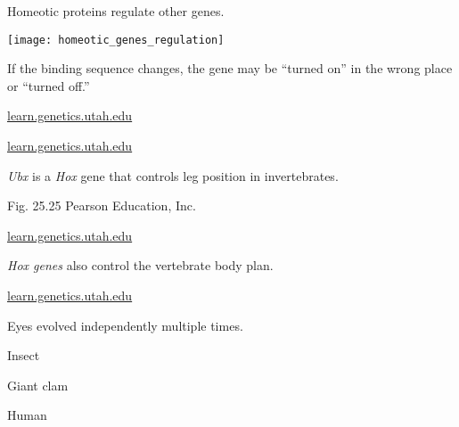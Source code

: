 \documentclass[t,handout]{beamer}  %
\begin{document}
%
\begin{frame}[t]{Homeotic proteins regulate other genes.}
	\vspace*{-0.5\baselineskip}
	\begin{center}
		\texttt{[image: homeotic\_genes\_regulation]}
	\end{center}
	
	If the binding sequence changes, the gene may be ``turned on'' in the wrong place or ``turned off.''
	\vfilll

	\hfill \tiny \href{http://learn.genetics.utah.edu/basics/hoxgenes}{learn.genetics.utah.edu}
\end{frame}
%
{
\begin{frame}[b]{}

	\tiny \href{http://learn.genetics.utah.edu/basics/hoxgenes}{learn.genetics.utah.edu}
\end{frame}
}
%
{
\begin{frame}[b]{\textit{Ubx} is a \textit{Hox} gene that controls leg position in invertebrates.}

	\hfill \tiny Fig. 25.25 \textcopyright Pearson Education, Inc.
\end{frame}
}
%
{
\begin{frame}[b]{}

	\tiny \href{http://learn.genetics.utah.edu/basics/hoxgenes}{learn.genetics.utah.edu}
\end{frame}
}
%
{
\begin{frame}[b]{\textit{Hox genes} also control the vertebrate body plan.}

	\tiny \href{http://learn.genetics.utah.edu/basics/hoxgenes}{learn.genetics.utah.edu}
\end{frame}
}
%
{
\begin{frame}[b]

\end{frame}
}
%
{
\begin{frame}{Eyes evolved independently multiple times.}

\begin{minipage}{0.27\textwidth}
	
	\flushright
	\vspace{2em}
	\hangpara Insect
	
	\vspace{5em}
	
	\hangpara Giant clam	
	\vspace{5em}
	
	\hangpara Human
	
\end{minipage}
\end{frame}
}
\end{document}
